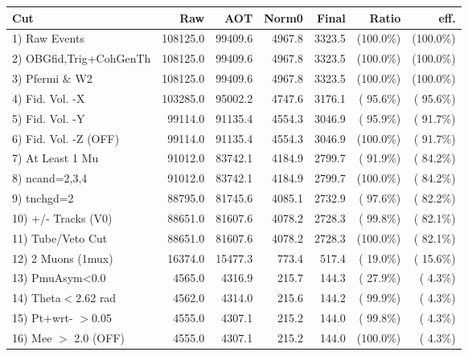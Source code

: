  \begin{table}[h!]\centering
 \begin{tabular}{||l||r|r|r|r|r|r||}
 \hline
 \hline
 Cut & Raw & AOT & Norm0 & Final & Ratio & eff.       \\
 \hline
  1) Raw Events           &     108125.0 &      99409.6 &       4967.8 &       3323.5 & (100.0\%) & (100.0\%) \\
  2) OBGfid,Trig+CohGenTh &     108125.0 &      99409.6 &       4967.8 &       3323.5 & (100.0\%) & (100.0\%) \\
  3) Pfermi \& W2         &     108125.0 &      99409.6 &       4967.8 &       3323.5 & (100.0\%) & (100.0\%) \\
  4) Fid. Vol. -X         &     103285.0 &      95002.2 &       4747.6 &       3176.1 & ( 95.6\%) & ( 95.6\%) \\
  5) Fid. Vol. -Y         &      99114.0 &      91135.4 &       4554.3 &       3046.9 & ( 95.9\%) & ( 91.7\%) \\
  6) Fid. Vol. -Z (OFF)   &      99114.0 &      91135.4 &       4554.3 &       3046.9 & (100.0\%) & ( 91.7\%) \\
  7) At Least 1 Mu        &      91012.0 &      83742.1 &       4184.9 &       2799.7 & ( 91.9\%) & ( 84.2\%) \\
  8) ncand=2,3,4          &      91012.0 &      83742.1 &       4184.9 &       2799.7 & (100.0\%) & ( 84.2\%) \\
  9) tnchgd=2             &      88795.0 &      81745.6 &       4085.1 &       2732.9 & ( 97.6\%) & ( 82.2\%) \\
 10) +/- Tracks (V0)      &      88651.0 &      81607.6 &       4078.2 &       2728.3 & ( 99.8\%) & ( 82.1\%) \\
 11) Tube/Veto Cut        &      88651.0 &      81607.6 &       4078.2 &       2728.3 & (100.0\%) & ( 82.1\%) \\
 12) 2 Muons (1mux)       &      16374.0 &      15477.3 &        773.4 &        517.4 & ( 19.0\%) & ( 15.6\%) \\
 13) PmuAsym<0.0          &       4565.0 &       4316.9 &        215.7 &        144.3 & ( 27.9\%) & (  4.3\%) \\
 14) Theta$<$2.62 rad     &       4562.0 &       4314.0 &        215.6 &        144.2 & ( 99.9\%) & (  4.3\%) \\
 15) Pt+wrt- $>$0.05      &       4555.0 &       4307.1 &        215.2 &        144.0 & ( 99.8\%) & (  4.3\%) \\
 16) Mee $>$ 2.0  (OFF)   &       4555.0 &       4307.1 &        215.2 &        144.0 & (100.0\%) & (  4.3\%) \\

\end{tabular}
\end{table}
